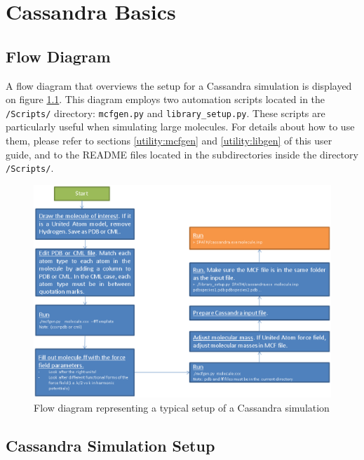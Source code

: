 %
\chapter{Cassandra Basics}
\section{Flow Diagram}
A flow diagram that overviews the setup for a Cassandra simulation is displayed on figure \ref{fig:flow_diagram}. 
This diagram employs two automation scripts located in the \texttt{/Scripts/} directory: \texttt{mcfgen.py} and \texttt{library\_setup.py}.
These scripts are particularly useful when simulating large molecules. 
For details about how to use them, please refer to sections \ref{utility:mcfgen} and \ref{utility:libgen} of this user guide, and to the README files located in 
the subdirectories inside the directory \texttt{/Scripts/}.

\begin{figure}[t]
\includegraphics[width=\linewidth]{setup_flowdiagram.eps}
\caption{Flow diagram representing a typical setup of a Cassandra simulation}\label{fig:flow_diagram}
\end{figure}




\section{Cassandra Simulation Setup}

